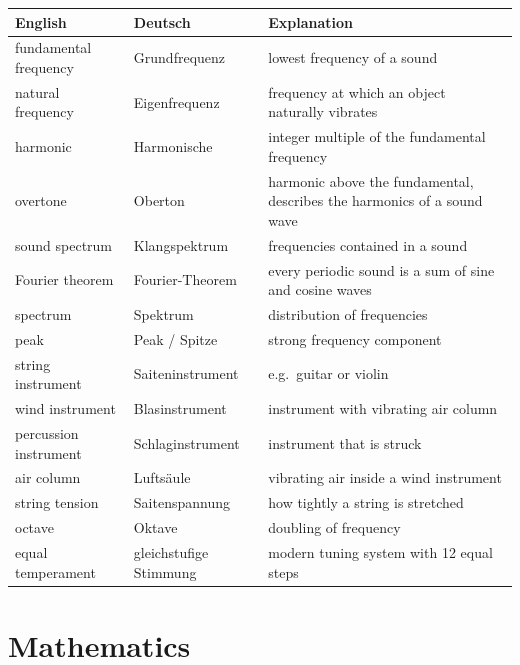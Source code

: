 \begin{tabular}{p{}p{}p{}}
\textbf{English} & \textbf{Deutsch} & \textbf{Explanation} \\ \hline
fundamental frequency & Grundfrequenz & lowest frequency of a sound \\
natural frequency & Eigenfrequenz & frequency at which an object naturally vibrates \\
harmonic & Harmonische & integer multiple of the fundamental frequency \\
overtone & Oberton & harmonic above the fundamental, describes the harmonics of a sound wave \\
sound spectrum & Klangspektrum & frequencies contained in a sound \\
Fourier theorem & Fourier-Theorem & every periodic sound is a sum of sine and cosine waves \\
spectrum & Spektrum & distribution of frequencies \\
peak & Peak / Spitze & strong frequency component \\
string instrument & Saiteninstrument & e.g.\ guitar or violin \\
wind instrument & Blasinstrument & instrument with vibrating air column \\
percussion instrument & Schlaginstrument & instrument that is struck \\
air column & Luftsäule & vibrating air inside a wind instrument \\
string tension & Saitenspannung & how tightly a string is stretched \\
octave & Oktave & doubling of frequency \\
equal temperament & gleichstufige Stimmung & modern tuning system with 12 equal steps \\
\end{tabular}

\vspace{0.7cm}

\section*{Mathematics}

